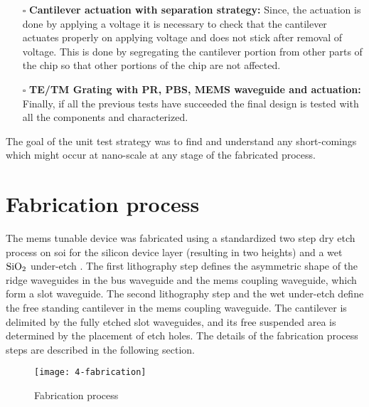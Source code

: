 \documentclass[../report.tex]{subfiles}
\begin{document}
\begin{itemize}[leftmargin=*]
	\item[$\square$] \textbf{Cantilever actuation with separation strategy:} Since, the actuation is done by applying a voltage it is necessary to check that the cantilever actuates properly on applying voltage and does not stick after removal of voltage. This is done by segregating the cantilever portion from other parts of the chip so that other portions of the chip are not affected. 
	
	\item[$\square$] \textbf{TE/TM Grating with PR, PBS, MEMS waveguide and actuation:} Finally, if all the previous tests have succeeded the final design is tested with all the components and characterized.
\end{itemize}
	
\noindent The goal of the unit test strategy was to find and understand any short-comings which might occur at nano-scale at any stage of the fabricated process.
	


\section{Fabrication process}\label{sec:fab_process}
The \gls{mems} tunable device was fabricated using a standardized two step dry etch process on \gls{soi} for the silicon device layer (resulting in two heights) and a wet $\mathrm{SiO_2}$ under-etch \cite{errando-herranz_low-power_2015}. The first lithography step defines the asymmetric shape of the ridge waveguides in the bus waveguide and the \gls{mems} coupling waveguide, which form a slot waveguide. The second lithography step and the wet under-etch define the free standing cantilever in the \gls{mems} coupling waveguide. The cantilever is delimited by the fully etched slot waveguides, and its free suspended area is determined by the placement of etch holes. The details of the fabrication process steps are described in the following section.

\begin{figure}[H] %
	\centering
	\texttt{[image: 4-fabrication]}
	\caption{Fabrication process}
	\label{fig:4_fabrication}
\end{figure}

\end{document}
